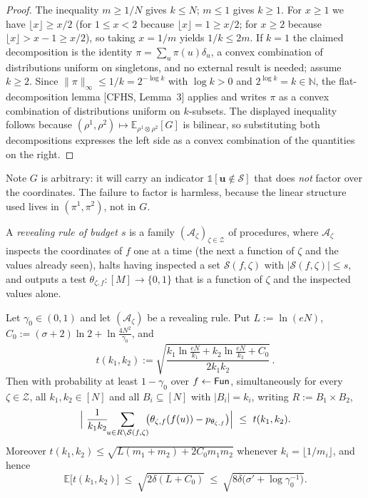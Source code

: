 \documentclass{aicr-solution}
\newcommand{\Fun}{\mathsf{Fun}}
\newcommand{\Exp}{\mathbb{E}}
\newcommand{\bits}{\{0,1\}}
\newcommand{\vu}{\mathbf{u}}
\newcommand{\ind}{\mathbb{1}}
\begin{document}
\begin{proof}
The inequality $m\ge1/N$ gives $k\le N$; $m\le1$ gives $k\ge1$. For $x\ge1$ we
have $\lfloor x\rfloor\ge x/2$ (for $1\le x<2$ because $\lfloor x\rfloor=1\ge x/2$;
for $x\ge2$ because $\lfloor x\rfloor>x-1\ge x/2$), so taking $x=1/m$ yields
$1/k\le2m$. If $k=1$ the claimed decomposition is the identity
$\pi=\sum_u\pi(u)\delta_u$, a convex combination of distributions uniform on
singletons, and no external result is needed; assume $k\ge2$. Since
$\|\pi\|_\infty\le1/k=2^{-\log k}$ with $\log k>0$ and $2^{\log k}=k\in\mathbb N$,
the flat-decomposition lemma [CFHS, Lemma~3] applies and writes $\pi$ as a convex
combination of distributions uniform on $k$-subsets. The displayed inequality
follows because $(\rho^1,\rho^2)\mapsto\Exp_{\rho^1\otimes\rho^2}[G]$ is
bilinear, so substituting both decompositions expresses the left side as a convex
combination of the quantities on the right.
\end{proof}

Note $G$ is arbitrary: it will carry an indicator $\ind[\vu\notin\mathcal S]$ that
does \emph{not} factor over the coordinates. The failure to factor is harmless, because the linear
structure used lives in $(\pi^1,\pi^2)$, not in $G$.

\begin{definition}\label{def:rr}
A \emph{revealing rule of budget $s$} is a family
$(\mathcal A_\zeta)_{\zeta\in\mathcal Z}$ of procedures, where $\mathcal A_\zeta$
inspects the coordinates of $f$ one at a time (the next a function of $\zeta$
and the values already seen), halts having inspected a set
$\mathcal S(f,\zeta)$ with $|\mathcal S(f,\zeta)|\le s$, and outputs a test
$\theta_{\zeta,f}:[M]\to\bits$ that is a function of $\zeta$ and the inspected
values alone.
\end{definition}

\begin{lemma}\label{lem:disc}
Let $\gamma_0\in(0,1)$ and let $(\mathcal A_\zeta)$ be a revealing rule. Put
$L:=\ln(eN)$, $C_0:=(\sigma+2)\ln2+\ln\frac{4N^{2}}{\gamma_0}$, and
\[
  t(k_1,k_2):=\sqrt{\frac{k_1\ln\frac{eN}{k_1}+k_2\ln\frac{eN}{k_2}+C_0}{2k_1k_2}}\,.
\]
Then with probability at least $1-\gamma_0$ over $f\sample\Fun$, simultaneously
for every $\zeta\in\mathcal Z$, all $k_1,k_2\in[N]$ and all $B_i\subseteq[N]$
with $|B_i|=k_i$, writing $R:=B_1\times B_2$,
\begin{equation}\label{eq:disc}
  \Bigl|\ \frac{1}{k_1k_2}\!\!\sum_{u\in R\setminus\mathcal S(f,\zeta)}\!\!
  \bigl(\theta_{\zeta,f}(f(u))-p_{\theta_{\zeta,f}}\bigr)\Bigr|\ \le\ t(k_1,k_2).
\end{equation}
Moreover $t(k_1,k_2)\le\sqrt{L(m_1+m_2)+2C_0m_1m_2}$ whenever
$k_i=\lfloor1/m_i\rfloor$, and hence
\begin{equation}\label{eq:Et}
  \Exp\bigl[t(k_1,k_2)\bigr]\ \le\ \sqrt{2\delta(L+C_0)}\ \le\
  \sqrt{8\delta\bigl(\sigma'+\log\gamma_0^{-1}\bigr)}.
\end{equation}
\end{lemma}
\end{document}
